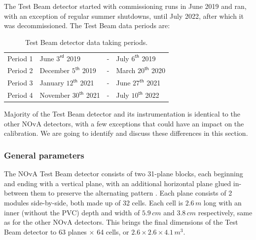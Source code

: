 \documentclass[12pt,a4paper]{article}
\begin{document}

The Test Beam detector started with commissioning runs in June 2019 and ran, with an exception of regular summer shutdowns, until July 2022, after which it was decommissioned. The Test Beam data periods are:
\begin{table}[!ht]
\centering
\def\arraystretch{1.4}
\begin{tabular}{l@{\hskip 1in}lcl}
Period 1 & June $3^{\textsf{rd}}$ 2019 & - & July $6^{\textsf{th}}$ 2019\\
Period 2 & December $5^{\textsf{th}}$ 2019 & - & March $20^{\textsf{th}}$ 2020\\
Period 3 & January $12^{\textsf{th}}$ 2021 & - & June $27^{\textsf{th}}$ 2021\\
Period 4 & November $30^{\textsf{th}}$ 2021 & - & July $10^{\textsf{th}}$ 2022
\end{tabular}
\caption{Test Beam detector data taking periods.}
\label{tabTestBeamPeriods}
\end{table}

Majority of the Test Beam detector and its instrumentation is identical to the other NOvA detectors, with a few exceptions that could have an impact on the calibration. We are going to identify and discuss these differences in this section.


\subsubsection*{General parameters}
The NOvA Test Beam detector consists of two 31-plane blocks, each beginning and ending with a vertical plane, with an additional horizontal plane glued in-between them to preserve the alternating pattern \cite{NOVA-doc-29543}. Each plane consists of 2 modules side-by-side, both made up of 32 cells. Each cell is $2.6\,\unit{m}$ long with an inner (without the PVC) depth and width of $5.9\,\unit{cm}$ and $3.8\,\unit{cm}$ respectively, same as for the other NOvA detectors. This brings the final dimensions of the Test Beam detector to 63 planes $\times$ 64 cells, or $2.6\times 2.6\times 4.1\,\unit{m^3}$.
\end{document}
